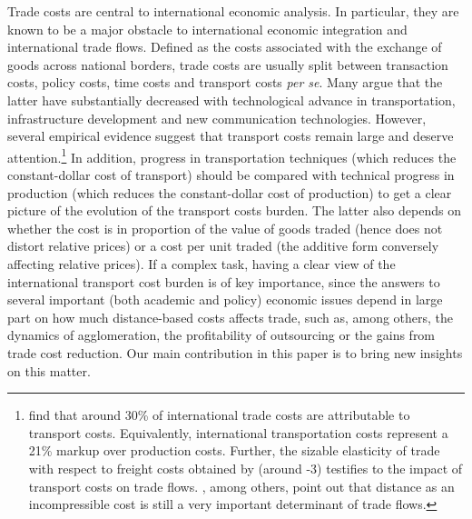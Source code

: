 \documentclass[a4paper,11pt]{article}
\begin{document}
Trade costs are central to international economic analysis. In particular, they are known to be a major obstacle to international economic integration and international trade flows. Defined as the costs associated with the exchange of goods across
national borders, trade costs are usually split between transaction costs, policy costs, time costs and transport costs \textit{per se}. Many argue that the latter have substantially decreased with technological advance in transportation, infrastructure development
and new communication technologies. However, several empirical evidence
suggest that transport costs remain large and deserve attention.\footnote{\cite{anderson_wincoop_jel} find that around 30\% of international trade costs are attributable to transport costs. Equivalently, international transportation costs represent a 21\% markup over production costs. Further, the sizable elasticity of trade with respect to freight costs obtained by \cite{Behar_Venables} (around -3) testifies to the impact of transport costs on trade flows. \cite{Disdier_Head08}, among others, point out that distance as an incompressible cost is still a very important determinant of trade flows.} In addition, progress in transportation techniques (which reduces the constant-dollar cost of transport) should be compared with technical progress in production (which reduces the constant-dollar cost of production) to get a clear picture of the evolution
of the transport costs burden. The latter also depends on whether the cost is in proportion of the value of goods traded (hence does not distort relative prices) or a cost per unit traded (the additive form conversely affecting relative prices). If a complex task, having a clear view of the international transport cost burden is of key importance, since the answers to several important (both academic and policy) economic issues depend in large part on how much distance-based costs affects trade, such as, among others, the dynamics of agglomeration, the profitability of outsourcing or the gains from trade cost reduction. Our main contribution in this paper is to bring new insights on this matter.\smallskip
\end{document}
